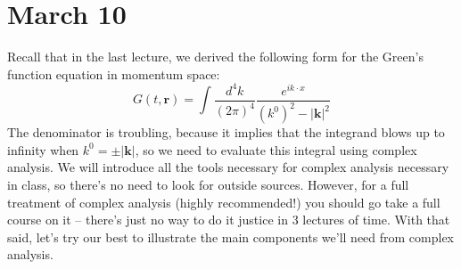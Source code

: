 \section{March 10}
Recall that in the last lecture, we derived the following form for the Green's function equation in momentum
space:
\[
	G(t, \mathbf{r}) = \int \frac{d^{4}k}{(2\pi)^{4}} \frac{ e^{i k\cdot x}}{(k^{0})^2 - |\mathbf{k}|^2}
\]
The denominator is troubling, because it implies that the integrand blows up to infinity when \( k^{0} =
\pm |\mathbf{k}| \), so we need to evaluate this integral using complex analysis. We will introduce all the
tools necessary for complex analysis necessary in class, so there's no need to look for outside sources.
However, for a full treatment of complex analysis (highly recommended!) you should go take a full course on
it -- there's just no way to do it justice in 3 lectures of time. With that said, let's try our best to
illustrate the main components we'll need from complex analysis.   

